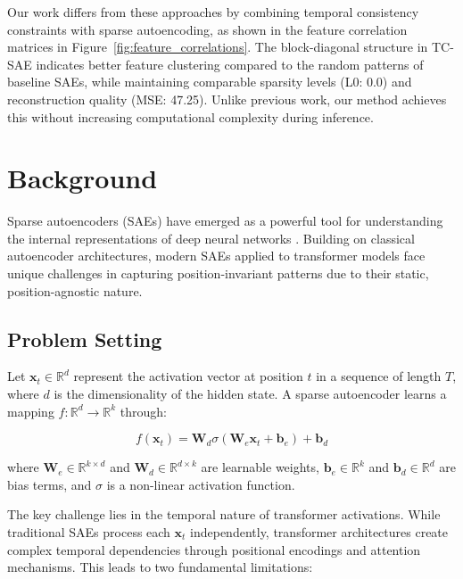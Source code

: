 \documentclass{article} %
\begin{document}
Our work differs from these approaches by combining temporal consistency constraints with sparse autoencoding, as shown in the feature correlation matrices in Figure~\ref{fig:feature_correlations}. The block-diagonal structure in TC-SAE indicates better feature clustering compared to the random patterns of baseline SAEs, while maintaining comparable sparsity levels (L0: 0.0) and reconstruction quality (MSE: 47.25). Unlike previous work, our method achieves this without increasing computational complexity during inference.

\section{Background}
\label{sec:background}

Sparse autoencoders (SAEs) have emerged as a powerful tool for understanding the internal representations of deep neural networks \cite{goodfellow2016deep}. Building on classical autoencoder architectures, modern SAEs applied to transformer models \cite{vaswani2017attention} face unique challenges in capturing position-invariant patterns due to their static, position-agnostic nature.

\subsection{Problem Setting}
Let $\mathbf{x}_t \in \mathbb{R}^d$ represent the activation vector at position $t$ in a sequence of length $T$, where $d$ is the dimensionality of the hidden state. A sparse autoencoder learns a mapping $f: \mathbb{R}^d \rightarrow \mathbb{R}^k$ through:

\begin{equation}
    f(\mathbf{x}_t) = \mathbf{W}_d \sigma(\mathbf{W}_e \mathbf{x}_t + \mathbf{b}_e) + \mathbf{b}_d
\end{equation}

where $\mathbf{W}_e \in \mathbb{R}^{k \times d}$ and $\mathbf{W}_d \in \mathbb{R}^{d \times k}$ are learnable weights, $\mathbf{b}_e \in \mathbb{R}^k$ and $\mathbf{b}_d \in \mathbb{R}^d$ are bias terms, and $\sigma$ is a non-linear activation function.

The key challenge lies in the temporal nature of transformer activations. While traditional SAEs process each $\mathbf{x}_t$ independently, transformer architectures \cite{vaswani2017attention} create complex temporal dependencies through positional encodings and attention mechanisms. This leads to two fundamental limitations:
\end{document}

